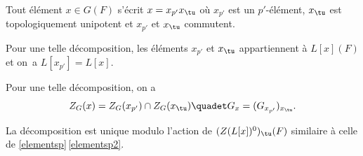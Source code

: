\skpt
\begin{lem*}
\begin{enumeratei}
\item\label{pelementsi}
Tout élément $x\in G(F)$ s'écrit $x=x_{p'}x_{\tu}$ où $x_{p'}$ est un $p'$-élément, $x_{\tu}$ est topologiquement unipotent et $x_{p'}$ et $x_{\tu}$ commutent.

\item\label{pelementsii}
Pour une telle décomposition, les éléments $x_{p'}$ et $x_{\tu}$ appartiennent à $L[x](F)$ et on~a $L[x_{p'}]=L[x]$.

\item\label{pelementsiii}
Pour une telle décomposition, on a
\[
Z_{G}(x)=Z_{G}(x_{p'})\cap Z_{G}(x_{\tu})\quadet G_{x}=(G_{x_{p'}})_{x_{\tu}}.
\]

\item\label{pelementsiv}
La décomposition est unique modulo l'action de $(Z(L[x])^0)_{\tu}(F)$ similaire à celle de \ref{elementsp}\,\eqref{elementsp2}.
\end{enumeratei}
\end{lem*}

